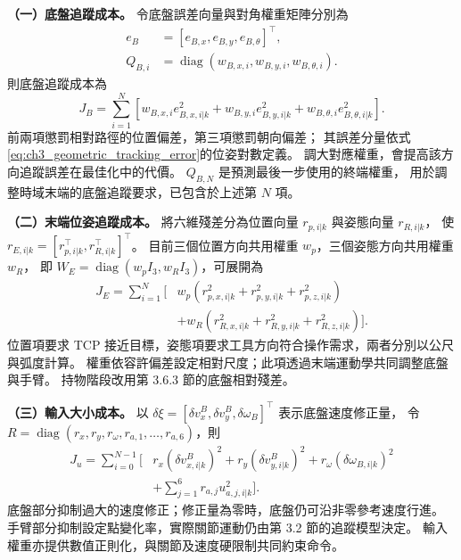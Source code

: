 \noindent\textbf{（一）底盤追蹤成本。}
令底盤誤差向量與對角權重矩陣分別為
\[
    \begin{aligned}
        e_B&=[e_{B,x},e_{B,y},e_{B,\theta}]^\top,\\
        Q_{B,i}&=\operatorname{diag}
        (w_{B,x,i},w_{B,y,i},w_{B,\theta,i}).
    \end{aligned}
\]
則底盤追蹤成本為
\begin{equation}
    J_B=\sum_{i=1}^{N}\left[
        w_{B,x,i}e_{B,x,i|k}^{2}
        +w_{B,y,i}e_{B,y,i|k}^{2}
        +w_{B,\theta,i}e_{B,\theta,i|k}^{2}\right].
    \label{eq:ch3_base_tracking_cost_expanded}
\end{equation}
前兩項懲罰相對路徑的位置偏差，第三項懲罰朝向偏差；
其誤差分量依式\eqref{eq:ch3_geometric_tracking_error}的位姿對數定義。
調大對應權重，會提高該方向追蹤誤差在最佳化中的代價。
$Q_{B,N}$ 是預測最後一步使用的終端權重，
用於調整時域末端的底盤追蹤要求，已包含於上述第 $N$ 項。

\noindent\textbf{（二）末端位姿追蹤成本。}
將六維殘差分為位置向量 $r_{p,i|k}$ 與姿態向量 $r_{R,i|k}$，
使 $r_{E,i|k}=[r_{p,i|k}^\top,r_{R,i|k}^\top]^\top$。
目前三個位置方向共用權重 $w_p$，三個姿態方向共用權重 $w_R$，
即 $W_E=\operatorname{diag}(w_p I_3,w_R I_3)$，可展開為
\begin{equation}
    \begin{aligned}
        J_E=\sum_{i=1}^{N}\big[&
        w_p(r_{p,x,i|k}^{2}+r_{p,y,i|k}^{2}+r_{p,z,i|k}^{2})\\
        &+w_R(r_{R,x,i|k}^{2}+r_{R,y,i|k}^{2}+r_{R,z,i|k}^{2})\big].
    \end{aligned}
    \label{eq:ch3_tcp_tracking_cost_expanded}
\end{equation}
位置項要求 TCP 接近目標，姿態項要求工具方向符合操作需求，兩者分別以公尺與弧度計算。
權重依容許偏差設定相對尺度；此項透過末端運動學共同調整底盤與手臂。
持物階段改用第 3.6.3 節的底盤相對殘差。

\noindent\textbf{（三）輸入大小成本。}
以 $\delta\xi=[\delta v_x^B,\delta v_y^B,\delta\omega_B]^\top$ 表示底盤速度修正量，
令 $R=\operatorname{diag}(r_x,r_y,r_\omega,r_{a,1},\ldots,r_{a,6})$，則
\begin{equation}
    \begin{aligned}
        J_u=\sum_{i=0}^{N-1}\big[&
        r_x(\delta v_{x,i|k}^{B})^{2}
        +r_y(\delta v_{y,i|k}^{B})^{2}
        +r_\omega(\delta\omega_{B,i|k})^{2}\\
        &+\sum_{j=1}^{6}r_{a,j}u_{a,j,i|k}^{2}\big].
    \end{aligned}
    \label{eq:ch3_input_cost_expanded}
\end{equation}
底盤部分抑制過大的速度修正；修正量為零時，底盤仍可沿非零參考速度行進。
手臂部分抑制設定點變化率，實際關節運動仍由第 3.2 節的追蹤模型決定。
輸入權重亦提供數值正則化，與關節及速度硬限制共同約束命令。

